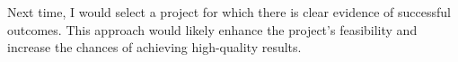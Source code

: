 \documentclass{article}
\begin{document}
Next time, I would select a project for which there is clear evidence 
of successful outcomes. This approach would likely enhance the project's 
feasibility and increase the chances of achieving high-quality results.






\end{document}
